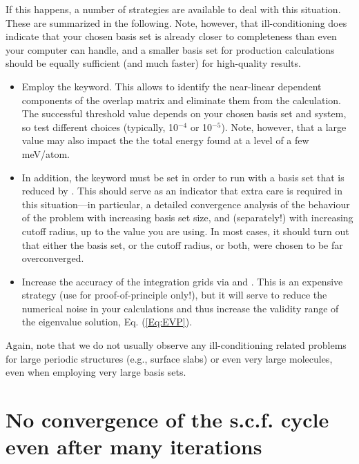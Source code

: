 If this happens, a number of strategies are available to deal with
this situation. These are summarized in the following. Note, however,
that ill-conditioning does indicate that your chosen basis set is
already closer to completeness than even your computer can handle, and
a smaller basis set for production calculations should be equally
sufficient (and much faster) for high-quality results.
\begin{itemize}
  \item Employ the  keyword. This allows to
    identify the near-linear dependent components of the overlap matrix
    and eliminate them from the calculation. The successful threshold
    value depends on your chosen basis set and system, so test
    different choices (typically, 10$^{-4}$ or 10$^{-5}$). Note,
    however, that a large  value may also
    impact the the total energy found at a level of a few meV/atom.
  \item In addition, the keyword 
    must be set in order to run with a basis set that is reduced by
    . This should serve as an indicator that
    extra care is required in this situation---in particular, a
    detailed convergence analysis of the behaviour of the problem with
    increasing basis set size, and (separately!) with increasing
    cutoff radius, up to the value you are using. In most cases, it
    should turn out that either the basis set, or the cutoff radius,
    or both, were chosen to be far overconverged.
  \item Increase the accuracy of the integration grids via
     and
    . This is an
    expensive strategy (use for proof-of-principle only!), but it will
    serve to reduce the numerical noise in your calculations and thus
    increase the validity range of the eigenvalue solution,
    Eq. (\ref{Eq:EVP}).
\end{itemize}
Again, note that we do not usually observe any ill-conditioning
related problems for large periodic structures (e.g., surface slabs)
or even very large molecules, even when employing very large basis
sets.

\section{No convergence of the s.c.f. cycle even after many iterations}
\label{sec:trouble-scf}

